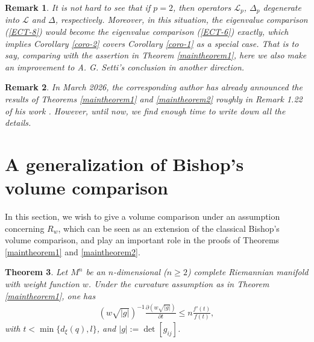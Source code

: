 \documentclass[12pt]{article}
\newtheorem{theorem}{Theorem}[section]
\newtheorem{remark}[theorem]{Remark}
\begin{document}
\begin{remark}
\rm{ It is not hard to see that if $p=2$, then operators
$\mathcal{L}_{p}$, $\Delta_{p}$ degenerate into $\mathcal{L}$ and
$\Delta$, respectively. Moreover, in this situation, the eigenvalue
comparison (\ref{ECT-8}) would become the eigenvalue comparison
(\ref{ECT-6}) exactly, which implies Corollary \ref{coro-2} covers
Corollary \ref{coro-1} as a special case. That is to say, comparing
with the assertion in Theorem
 \ref{maintheorem1}, here we also make an improvement to A. G. Setti's
conclusion \cite[Theorem 4.2]{SAG} in another direction. }
\end{remark}


\begin{remark}
\rm{ In March 2026, the corresponding author has already announced
the results of Theorems \ref{maintheorem1} and \ref{maintheorem2}
roughly in Remark 1.22 of his work \cite{JM-1}. However, until now,
we find enough time to write down all the details. }
\end{remark}


\section{A generalization of Bishop's volume comparison} \label{sect3}
\renewcommand{\thesection}{\arabic{section}}
\renewcommand{\theequation}{\thesection.\arabic{equation}}
\setcounter{equation}{0}

In this section, we wish to give a volume comparison under an
assumption concerning $R_{w}$, which can be seen as an extension of
the classical Bishop's volume comparison, and play an important role
in the proofs of Theorems \ref{maintheorem1} and \ref{maintheorem2}.

\begin{theorem}  \label{theorem3}
Let $M^n$ be an $n$-dimensional ($n\geq2$) complete Riemannian
manifold with weight function $w$. Under the curvature assumption as
in Theorem \ref{maintheorem1}, one has
 \begin{eqnarray*}
(w\sqrt{|g|})^{-1}\frac{\partial (w\sqrt{|g|})}{\partial t}\leq
n\frac{f'(t)}{f(t)},
 \end{eqnarray*}
with $t<\min\{d_{\xi}(q),l\}$, and $|g|:=\det[g_{ij}]$.
\end{theorem}
\end{document}

